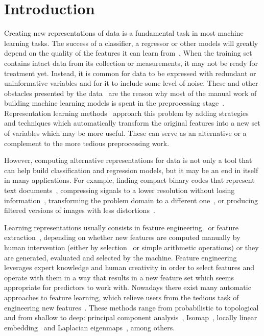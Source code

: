 \documentclass[
	fontsize=11pt, %
	twoside=false, %
	open=any, %
	secnumdepth=1, %
]{kaobook}
\begin{document}
\section{Introduction}

Creating new representations of data is a fundamental task in most machine learning tasks. The success of a classifier, a regressor or other models will greatly depend on the quality of the features it can learn from~\cite{domingos-useful}. When the training set contains intact data from its collection or measurements, it may not be ready for treatment yet. Instead, it is common for data to be expressed with redundant or uninformative variables and for it to include some level of noise. These and other obstacles presented by the data~\cite{lorena2019complex} are the reason why most of the manual work of building machine learning models is spent in the preprocessing stage~\cite{garcia2015data}. Representation learning methods~\cite{bengio} approach this problem by adding strategies and techniques which automatically transform the original features into a new set of variables which may be more useful. These can serve as an alternative or a complement to the more tedious preprocessing work.

However, computing alternative representations for data is not only a tool that can help build classification and regression models, but it may be an end in itself in many applications. For example, finding compact binary codes that represent text documents~\cite{salakhutdinov}, compressing signals to a lower resolution without losing information~\cite{compression}, transforming the problem domain to a different one~\cite{transferlearning}, or producing filtered versions of images with less distortions~\cite{xie}.

Learning representations usually consists in feature engineering~\cite{domingos-useful} or feature extraction~\cite{featext}, depending on whether new features are computed manually by human intervention (either by selection~\cite{dash1997feature} or simple arithmetic operations) or they are generated, evaluated and selected by the machine. Feature engineering leverages expert knowledge and human creativity in order to select features and operate with them in a way that results in a new feature set which seems appropriate for predictors to work with. Nowadays there exist many automatic approaches to feature learning, which relieve users from the tedious task of engineering new features~\cite{bengio}. These methods range from probabilistic to topological and from shallow to deep: principal component analysis~\cite{PCABook}, Isomap~\cite{Isomap}, locally linear embedding~\cite{LLE} and Laplacian eigenmaps~\cite{LaplacianEigenmaps}, among others.
\end{document}
